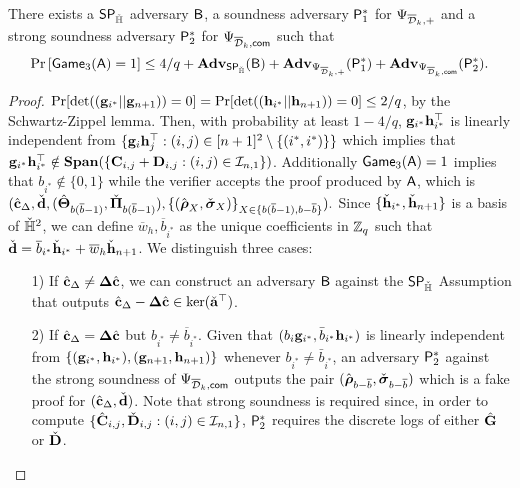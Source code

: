 \begin{lemma} There exists a $\mathsf{SP}_{{\check{\mathbb{H}}}}$ adversary $\mathcal{\mathsf{B}}$, a soundness adversary $\mathsf{P}^*_1$  for ${\Psi_{\overline{\mathcal{D}}_k,+}}$ and 
a strong soundness adversary $\mathsf{P}^*_2$ for ${\Psi_{\overline{\mathcal{D}}_k,\mathsf{com}}}$  such that
$$\Pr\left[\mathsf{Game}_3(\mathsf{A})=1\right] \leq 4/q + \mathbf{Adv}_{\mathsf{SP}_{\check{\mathbb{H}}}}(\mathsf{B}) +
\mathbf{Adv}_{\Psi_{\overline{\mathcal{D}}_k,+}}(\mathsf{P}^*_1)+\mathbf{Adv}_{\Psi_{\overline{\mathcal{D}}_k,\mathsf{com}}}(\mathsf{P}^*_2).$$  
\label{lemma:G3}
\end{lemma}
\begin{proof}
$\Pr[\det((\mathbf{g}_{i^*}||\mathbf{g}_{n+1}))=0]=\Pr[\det((\mathbf{h}_{i^*}||\mathbf{h}_{n+1}))=0]\leq2/q$, by the Schwartz-Zippel lemma. Then, with probability at least $1-4/q$, $\mathbf{g}_{i^*}\mathbf{h}_{i^*}^\top$ is linearly independent from
$\{\mathbf{g}_{i}\mathbf{h}_j^\top:(i,j)\in[n+1]^2\setminus\{(i^*, i^*)\}\}$ which implies that $\mathbf{g}_{i^*}\mathbf{h}_{i^*}^\top\notin\mathbf{Span}(\{\mathbf{{C}}_{i,j}+\mathbf{{D}}_{i,j}:(i,j)\in\mathcal{I}_{n,1}\})$. 
Additionally  $\mathsf{Game}_3(\mathsf{A})=1$ implies that $b_{i^*} \notin \{0,1\}$
while the verifier accepts the proof  produced by $\mathsf{A}$, which is
$ (
        {\hat{\mathbf{c}}}_{\Delta}, \check{\mathbf{d}},
        ({\hat{\mathbf{{\Theta}}}}_{b(\overline{b}-1)}, \check{\mathbf{{\Pi}}}_{b(\overline{b}-1)}), 
        \{(\hat{\boldsymbol \rho}_{X}, \check{\boldsymbol \sigma}_{X})\}_{X \in \{b(\overline{b}-1), b-\overline{b}\}} ).$ Since $\{\check{\mathbf{h}}_{i^*},\check{\mathbf{h}}_{n+1}\}$ is a basis of ${\check{\mathbb{H}}}^2$,
we can define $\overline{w}_h,\overline{b}_{i^*}$ as the unique coefficients in $\mathbb{Z}_q$ such that $\check{\mathbf{d}}= \overline{b}_{i^*} \check{\mathbf{h}}_{i^*} + \overline{w}_h \check{\mathbf{h}}_{n+1}$.
We distinguish three cases:
\begin{itemize}
\item[1)] If $\hat{\mathbf{c}}_{\Delta} \neq \mathbf{{\Delta}} \hat{\mathbf{c}}$, we can construct an adversary 
$\mathsf{B}$ against the $\mathsf{SP}_{{\check{\mathbb{H}}}}$ Assumption that outputs 
$\hat{\mathbf{c}}_{\Delta}-\mathbf{{\Delta}} \hat{\mathbf{c}}\in\ker(\check{\mathbf{{a}}}^\top)$.
\item[2)] If $\hat{\mathbf{c}}_{\Delta} = \mathbf{{\Delta}} \hat{\mathbf{c}}$ but $b_{i^*} \neq \overline{b}_{i^*}$. Given that $(b_{i}\mathbf{g}_{i^*},\bar{b}_{i^*}\mathbf{h}_{i^*})$ is linearly independent from $\{(\mathbf{g}_{i^*},\mathbf{h}_{i^*}),(\mathbf{g}_{n+1},\mathbf{h}_{n+1})\}$
whenever $b_{i^*}\neq\bar{b}_{i^*}$, an adversary
$\mathsf{P}^*_2$ against the strong soundness of ${\Psi_{\overline{\mathcal{D}}_k,\mathsf{com}}}$
outputs the pair $(\hat{{\boldsymbol \rho}}_{b-\overline{b}},
\check{{\boldsymbol \sigma}}_{b-\overline{b}})
$ which is a fake proof for 
$({\hat{\mathbf{c}}}_\Delta,\check{\mathbf{d}})$. Note that strong soundness is required since, in order to compute $\{{\hat{\mathbf{{C}}}}_{i,j},\check{\mathbf{{D}}}_{i,j}:(i,j)\in\mathcal{I}_{n,1}\}$, $\mathsf{P}^*_2$ requires the discrete logs of either ${\hat{\mathbf{{G}}}}$ or $\check{\mathbf{{D}}}$.

\end{itemize}
\end{proof}
